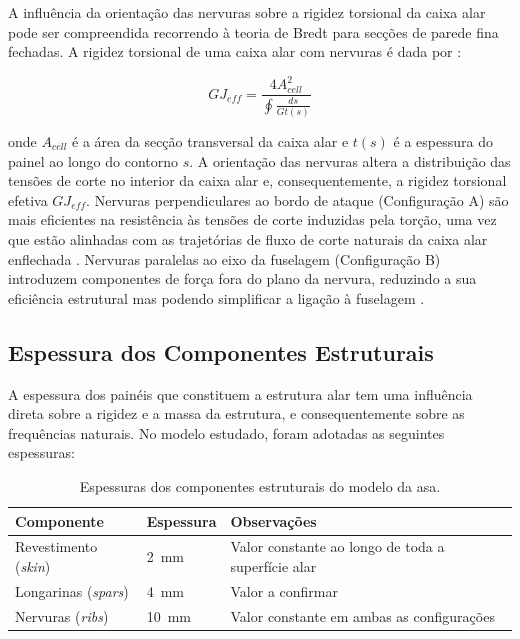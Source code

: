 \documentclass[11pt,twoside,a4paper]{report}
\begin{document}
A influência da orientação das nervuras sobre a rigidez torsional da caixa alar pode ser compreendida recorrendo à teoria de Bredt para secções de parede fina fechadas. A rigidez torsional de uma caixa alar com nervuras é dada por \cite{Megson2012}:

\begin{equation}
    GJ_{eff} = \frac{4A_{cell}^2}{\oint \frac{ds}{Gt(s)}}
    \label{eq:bredt}
\end{equation}

\noindent onde $A_{cell}$ é a área da secção transversal da caixa alar e $t(s)$ é a espessura do painel ao longo do contorno $s$. A orientação das nervuras altera a distribuição das tensões de corte no interior da caixa alar e, consequentemente, a rigidez torsional efetiva $GJ_{eff}$. Nervuras perpendiculares ao bordo de ataque (Configuração A) são mais eficientes na resistência às tensões de corte induzidas pela torção, uma vez que estão alinhadas com as trajetórias de fluxo de corte naturais da caixa alar enflechada \cite{Niu1988, Megson2012}. Nervuras paralelas ao eixo da fuselagem (Configuração B) introduzem componentes de força fora do plano da nervura, reduzindo a sua eficiência estrutural mas podendo simplificar a ligação à fuselagem \cite{Raymer2018}.

\subsection{Espessura dos Componentes Estruturais}

A espessura dos painéis que constituem a estrutura alar tem uma influência direta sobre a rigidez e a massa da estrutura, e consequentemente sobre as frequências naturais. No modelo estudado, foram adotadas as seguintes espessuras:

\begin{table}[h!]
\centering
\caption{Espessuras dos componentes estruturais do modelo da asa.}
\label{tab:espessuras}
\renewcommand{\arraystretch}{1.4}
\begin{tabularx}{\textwidth}{p{4cm} p{3cm} X}
\toprule
\textbf{Componente} & \textbf{Espessura} & \textbf{Observações} \\
\midrule
Revestimento (\textit{skin})    & \SI{2}{\milli\meter}  & 
    Valor constante ao longo de toda a superfície alar \\
Longarinas (\textit{spars})     & \SI{4}{\milli\meter}  & 
    Valor a confirmar\footnotemark \\
Nervuras (\textit{ribs})        & \SI{10}{\milli\meter} & 
    Valor constante em ambas as configurações \\
\bottomrule
\end{tabularx}
\end{table}
\end{document}
